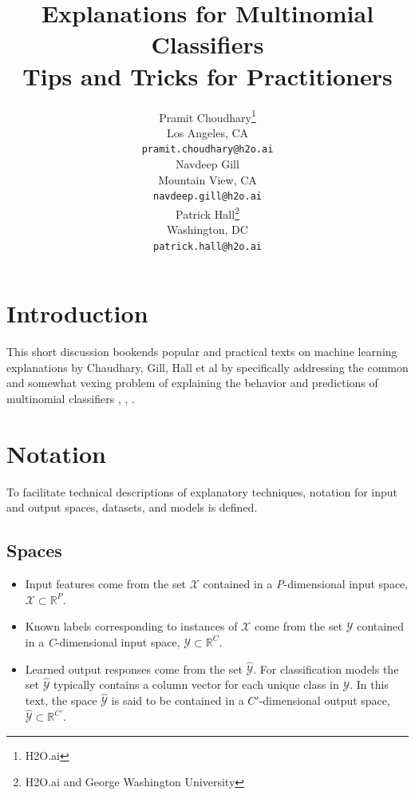 \documentclass{article}
\title{Explanations for Multinomial Classifiers\\\vspace{10pt}\small{Tips and Tricks for Practitioners}}
\author{
  Pramit Choudhary\thanks{H2O.ai}\\
  Los Angeles, CA\\
  \texttt{pramit.choudhary@h2o.ai}\\
  \And
  Navdeep Gill\samethanks\\
  Mountain View, CA\\
  \texttt{navdeep.gill@h2o.ai}\\ 
  \And
  Patrick Hall\thanks{H2O.ai and George Washington University}\\
  Washington, DC\\
  \texttt{patrick.hall@h2o.ai}}
\begin{document}
\maketitle

\begin{abstract}


\end{abstract}

\section{Introduction}

This short discussion bookends popular and practical texts on machine learning explanations by Chaudhary, Gill, Hall et al by specifically addressing the common and somewhat vexing problem of explaining the behavior and predictions of multinomial classifiers \cite{oreillymli}, \cite{art_and_sci}, \cite{oreillyskater}.  


\section{Notation} \label{sec:notation}

To facilitate technical descriptions of explanatory techniques, notation for input and output spaces, datasets, and models is defined.

\subsection{Spaces} 
 
	\begin{itemize}
		\item Input features come from the set $\mathcal{X}$ contained in a \textit{P}-dimensional input space,\\ $\mathcal{X} \subset \mathbb{R}^P$.  
		\item Known labels corresponding to instances of $\mathcal{X}$ come from the set $\mathcal{Y}$ contained in a \textit{C}-dimensional input space, $\mathcal{Y} \subset \mathbb{R}^C$.
		\item Learned output responses come from the set $\hat{\mathcal{Y}}$. For classification models the set $\hat{\mathcal{Y}}$ typically contains a column vector for each unique class in $\mathcal{Y}$. In this text, the space $\hat{\mathcal{Y}}$ is said to be contained in a $C'$-dimensional output space,  $\hat{\mathcal{Y}} \subset \mathbb{R}^{C'}$. 
	\end{itemize}	
	
\end{document}
